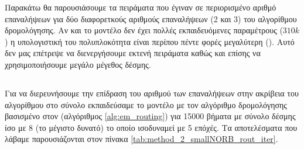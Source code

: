 Παρακάτω θα παρουσιάσουμε τα πειράματα που έγιναν σε περιορισμένο αριθμό επαναλήψεων για δύο διαφορετκούς αριθμούς επαναλήψεων (2 και 3) του αλγορίθμου δρομολόγησης. Αν και το μοντέλο δεν έχει πολλές εκπαιδευόμενες παραμέτρους ($310k$) η υπολογιστική του πολυπλοκότητα είναι περίπου πέντε φορές μεγαλύτερη (). Αυτό δεν μας επέτρεψε να διενεργήσουμε εκτενή πειράματα καθώς και επίσης να χρησιμοποιήσουμε μεγάλο μέγεθος δέσμης.

\subsection{}
Για να διερευνήσουμε την επίδραση του αριθμού των επαναλήψεων στην ακρίβεια του αλγορίθμου στο σύνολο  εκπαιδεύσαμε το μοντέλο με τον αλγόριθμο δρομολόγησης βασισμένο στον  (αλγόριθμος \ref{alg:em_routing}) για 15000 βήματα με σύνολο δέσμης ίσο με 8 (το μέγιστο δυνατό) το οποίο ισοδυναμεί με 5 επόχές. Τα αποτελέσματα που λάβαμε παρουσιάζονται στον πίνακα \ref{tab:method_2_smallNORB_rout_iter}.
\begin{table}[h]
    \begin{center}
    \end{center}
    \caption[]{\label{tab:method_2_smallNORB_rout_iter}Πίνακας στον οποίο φαίνεται η επίδραση του αριθμού των επαναλήψεων στην ακρίβεια όπως μετράται από το σύνολο ελέγχου , όταν χρησιμοποιούνται πολύ λίγες εποχές για την εκπαίδευση του μοντέλου.} 
\end{table}

